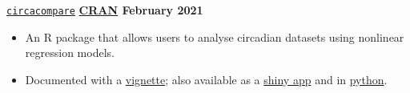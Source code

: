 \texttt{\href{https://github.com/RWParsons/circacompare}{circacompare}} \hfill \textbf{\href{https://cran.r-project.org/package=circacompare}{CRAN} February 2021} \par
\begin{itemize}
    \item An R package that allows users to analyse circadian datasets using nonlinear regression models.
    \item Documented with a \href{https://cran.r-project.org/web/packages/circacompare/vignettes/circacompare-vignette.html}{vignette}; also available as a \href{https://rwparsons.shinyapps.io/circacompare/}{shiny app} and in \href{https://github.com/RWParsons/circacompare_py}{python}.
\end{itemize}